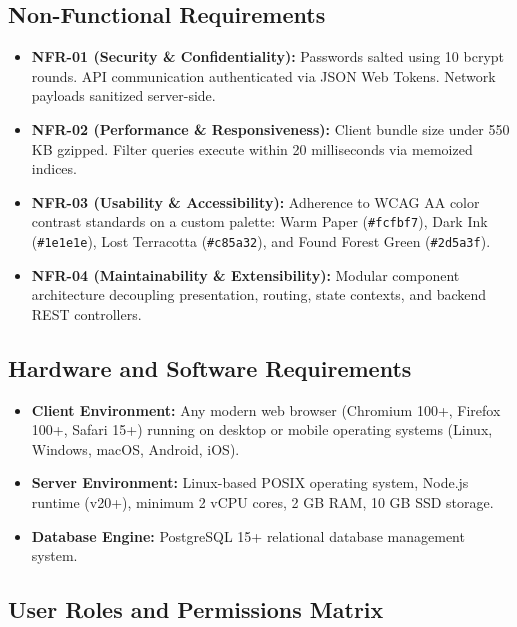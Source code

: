 \documentclass[11pt,a4paper]{article}
\begin{document}
\subsection{Non-Functional Requirements}
\begin{itemize}
    \item \textbf{NFR-01 (Security \& Confidentiality):} Passwords salted using 10 bcrypt rounds. API communication authenticated via JSON Web Tokens. Network payloads sanitized server-side.
    \item \textbf{NFR-02 (Performance \& Responsiveness):} Client bundle size under 550 KB gzipped. Filter queries execute within 20 milliseconds via memoized indices.
    \item \textbf{NFR-03 (Usability \& Accessibility):} Adherence to WCAG AA color contrast standards on a custom palette: Warm Paper (\texttt{\#fcfbf7}), Dark Ink (\texttt{\#1e1e1e}), Lost Terracotta (\texttt{\#c85a32}), and Found Forest Green (\texttt{\#2d5a3f}).
    \item \textbf{NFR-04 (Maintainability \& Extensibility):} Modular component architecture decoupling presentation, routing, state contexts, and backend REST controllers.
\end{itemize}

\subsection{Hardware and Software Requirements}
\begin{itemize}
    \item \textbf{Client Environment:} Any modern web browser (Chromium 100+, Firefox 100+, Safari 15+) running on desktop or mobile operating systems (Linux, Windows, macOS, Android, iOS).
    \item \textbf{Server Environment:} Linux-based POSIX operating system, Node.js runtime (v20+), minimum 2 vCPU cores, 2 GB RAM, 10 GB SSD storage.
    \item \textbf{Database Engine:} PostgreSQL 15+ relational database management system.
\end{itemize}

\subsection{User Roles and Permissions Matrix}
\end{document}
